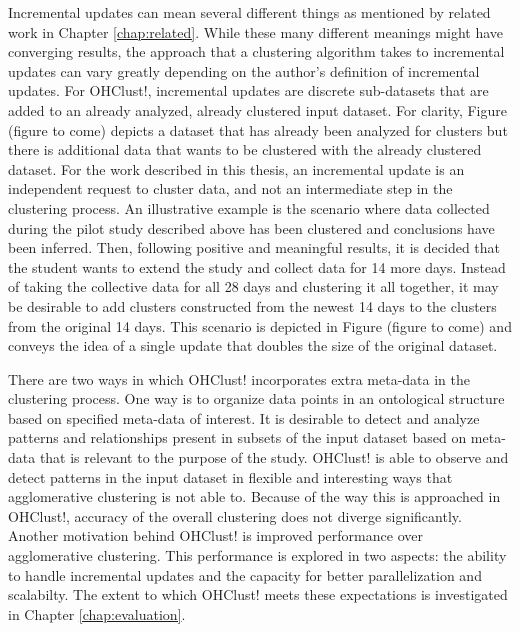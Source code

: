 \documentclass[12pt]{ucthesis}
\begin{document}
      Incremental updates can mean several different things as mentioned by
      related work in Chapter \ref{chap:related}. While these many different
      meanings might have converging results, the approach that a clustering
      algorithm takes to incremental updates can vary greatly depending on the
      author's definition of incremental updates. For \textsf{OHClust!},
      incremental updates are discrete sub-datasets that are added to an
      already analyzed, already clustered input dataset. For clarity, Figure
      (figure to come) depicts a dataset that has already been analyzed for
      clusters but there is additional data that wants to be clustered with the
      already clustered dataset. For the work described in this thesis, an
      incremental update is an independent request to cluster data, and not an
      intermediate step in the clustering process. An illustrative example is
      the scenario where data collected during the pilot study described above
      has been clustered and conclusions have been inferred. Then, following
      positive and meaningful results, it is decided that the student wants to
      extend the study and collect data for 14 more days. Instead of taking the
      collective data for all 28 days and clustering it all together, it may be
      desirable to add clusters constructed from the newest 14 days to the
      clusters from the original 14 days. This scenario is depicted in Figure
      (figure to come) and conveys the idea of a single update that doubles the
      size of the original dataset.

      There are two ways in which \textsf{OHClust!} incorporates extra meta-data
      in the clustering process. One way is to organize data points in an
      ontological structure based on specified meta-data of interest. It is
      desirable to detect and analyze patterns and relationships present in
      subsets of the input dataset based on meta-data that is relevant to the
      purpose of the study. \textsf{OHClust!} is able to observe and detect
      patterns in the input dataset in flexible and interesting ways that
      \textsf{agglomerative clustering} is not able to. Because of the way this
      is approached in \textsf{OHClust!}, accuracy of the overall clustering does
      not diverge significantly. Another motivation behind \textsf{OHClust!} is
      improved performance over \textsf{agglomerative clustering}. This performance is
      explored in two aspects: the ability to handle incremental updates and the
      capacity for better parallelization and scalabilty. The extent to which
      \textsf{OHClust!} meets these expectations is investigated in Chapter
      \ref{chap:evaluation}.
\end{document}
